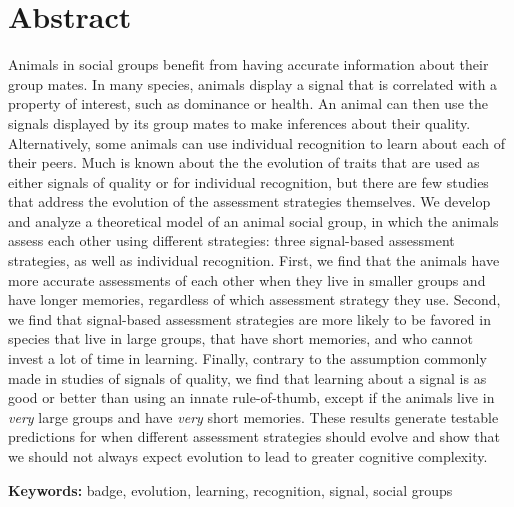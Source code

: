 \section*{Abstract}
Animals in social groups benefit from having accurate information about their group mates. In many species, animals display a signal that is correlated with a property of interest, such as dominance or health. An animal can then use the signals displayed by its group mates to make inferences about their quality. Alternatively, some animals can use individual recognition to learn about each of their peers. Much is known about the the evolution of traits that are used as either signals of quality or for individual recognition, but there are few studies that address the evolution of the assessment strategies themselves. We develop and analyze a theoretical model of an animal social group, in which the animals assess each other using different strategies: three signal-based assessment strategies, as well as individual recognition. First, we find that the animals have more accurate assessments of each other when they live in smaller groups and have longer memories, regardless of which assessment strategy they use. Second, we find that signal-based assessment strategies are more likely to be favored in species that live in large groups, that have short memories, and who cannot invest a lot of time in learning. Finally, contrary to the assumption commonly made in studies of signals of quality, we find that learning about a signal is as good or better than using an innate rule-of-thumb, except if the animals live in \emph{very} large groups and have \emph{very} short memories. These results generate testable predictions for when different assessment strategies should evolve and show that we should not always expect evolution to lead to greater cognitive complexity. 


\textbf{Keywords:} badge, evolution, learning, recognition, signal, social groups

\newpage

